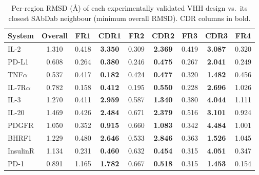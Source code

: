 \documentclass[11pt]{article}
\begin{document}
\begin{table}[!htbp]
\centering
\begin{tabular}{l*{8}{c}}
\toprule
System & Overall & FR1 & CDR1 & FR2 & CDR2 & FR3 & CDR3 & FR4\\
\midrule
IL-2     & 1.310 & 0.418 & \textbf{3.350} & 0.309 & \textbf{2.369} & 0.419 & \textbf{3.087} & 0.320\\
PD-L1    & 0.608 & 0.264 & \textbf{0.380} & 0.246 & \textbf{0.475} & 0.267 & \textbf{2.041} & 0.249\\
TNF$\alpha$  & 0.537 & 0.417 & \textbf{0.182} & 0.424 & \textbf{0.477} & 0.320 & \textbf{1.482} & 0.456\\
IL-7R$\alpha$ & 0.782 & 0.158 & \textbf{0.412} & 0.195 & \textbf{0.550} & 0.228 & \textbf{2.696} & 1.026\\
IL-3     & 1.270 & 0.411 & \textbf{2.959} & 0.587 & \textbf{1.340} & 0.380 & \textbf{4.044} & 1.111\\
IL-20    & 1.469 & 0.426 & \textbf{2.484} & 0.671 & \textbf{2.379} & 0.516 & \textbf{3.101} & 0.924\\
PDGFR    & 1.050 & 0.352 & \textbf{0.915} & 0.660 & \textbf{1.083} & 0.342 & \textbf{4.484} & 1.001\\
BHRF1    & 1.229 & 0.480 & \textbf{2.646} & 0.533 & \textbf{2.846} & 0.363 & \textbf{1.526} & 1.045\\
InsulinR & 1.134 & 0.231 & \textbf{0.460} & 0.632 & \textbf{0.454} & 0.315 & \textbf{4.051} & 0.347\\
PD-1     & 0.891 & 1.165 & \textbf{1.782} & 0.667 & \textbf{0.518} & 0.315 & \textbf{1.453} & 0.154\\
\bottomrule
\end{tabular}
\caption{Per-region RMSD (\AA{}) of each experimentally validated VHH design vs.\ its closest SAbDab
neighbour (minimum overall RMSD). CDR columns in bold.}
\label{tab:sabdab_valid}
\end{table}
\end{document}
